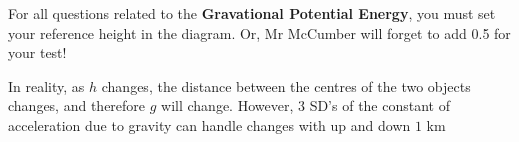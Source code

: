 \begin{remark}
    For all questions related to the \textbf{Gravational Potential Energy}, you must set your reference height in the diagram. Or, Mr McCumber will forget to add 0.5 for your test!
\end{remark}

In reality, as $h$ changes, the distance between the centres of the two objects changes, and therefore $g$ will change. However, 3 SD's of the 
constant of acceleration due to gravity can handle changes with up and down $1$ km
